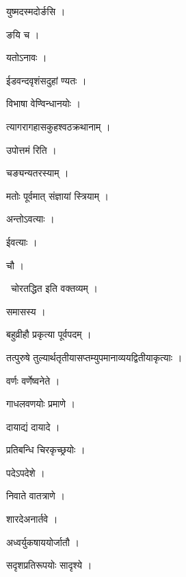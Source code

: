 \documentclass[10pt, openany, oneside]{book}
\begin{document}
\noindent युष्मदस्मदोर्ङसि ।

\noindent ङयि च ।

\noindent यतोऽनावः ।

\noindent ईडवन्दवृशंसदुहां ण्यतः ।

\noindent विभाषा वेण्विन्धानयोः ।

\noindent त्यागरागहासकुहश्वठक्रथानाम् ।

\noindent उपोत्तमं रिति ।

\noindent चङ्यन्यतरस्याम् ।

\noindent मतोः पूर्वमात् संज्ञायां स्त्रियाम् ।

\noindent अन्तोऽवत्याः ।

\noindent ईवत्याः ।

\noindent चौ ।

\par\noindent\hspace{1.5em}{\vps वा॰}~{\qt चोरतद्धित इति वक्तव्यम् ।}

\noindent समासस्य ।

\noindent बहुव्रीहौ प्रकृत्या पूर्वपदम् ।

\noindent तत्पुरुषे तुल्यार्थतृतीयासप्तम्युपमानाव्ययद्वितीयाकृत्याः ।

\noindent वर्णः वर्णेष्वनेते ।

\noindent गाधलवणयोः प्रमाणे ।

\noindent दायाद्यं दायादे ।

\noindent प्रतिबन्धि चिरकृच्छ्रयोः ।

\noindent पदेऽपदेशे ।

\noindent निवाते वातत्राणे ।

\noindent शारदेअनार्तवे ।

\noindent अध्वर्युकषाययोर्जातौ ।

\noindent सदृशप्रतिरूपयोः सादृश्ये ।
\end{document}
